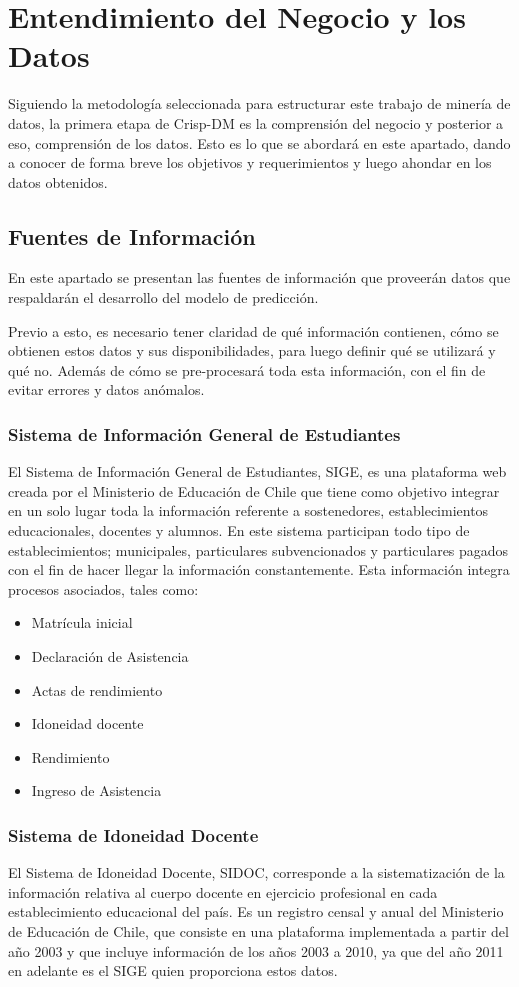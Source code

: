 \section{Entendimiento del Negocio y los Datos}
Siguiendo la metodología seleccionada para estructurar este trabajo de minería de datos, la primera etapa de Crisp-DM es la comprensión del negocio y posterior a eso, comprensión de los datos. Esto es lo que se abordará en este apartado, dando a conocer de forma breve los objetivos y requerimientos y luego ahondar en los datos obtenidos. 



\subsection{Fuentes de Información}
En este apartado se presentan las fuentes de información que proveerán datos que respaldarán el desarrollo del modelo de predicción. 

Previo a esto, es necesario tener claridad de qué información contienen, cómo se obtienen estos datos y sus disponibilidades, para luego definir qué se utilizará y qué no. Además de cómo se pre-procesará toda esta información, con el fin de evitar errores y datos anómalos. 

\subsubsection{Sistema de Información General de Estudiantes}
El Sistema de Información General de Estudiantes, SIGE, es una plataforma web creada por el Ministerio de Educación de Chile que tiene como objetivo integrar en un solo lugar toda la información referente a sostenedores, establecimientos educacionales, docentes y alumnos. 
En este sistema participan todo tipo de establecimientos; municipales, particulares subvencionados y particulares pagados con el fin de hacer llegar la información constantemente. 
Esta información integra procesos asociados, tales como:
\begin{itemize}
\item Matrícula inicial
\item Declaración de Asistencia
\item Actas de rendimiento 
\item Idoneidad docente
\item Rendimiento 
\item Ingreso de Asistencia
\end{itemize}

\subsubsection{Sistema de Idoneidad Docente}
El Sistema de Idoneidad Docente, SIDOC, corresponde a la sistematización de la información relativa al cuerpo docente en ejercicio profesional en cada establecimiento educacional del país. Es un registro censal y anual del Ministerio de Educación de Chile, que consiste en una plataforma implementada a partir del año 2003 y que incluye información de los años 2003 a 2010, ya que del año 2011 en adelante es el SIGE quien proporciona estos datos.


